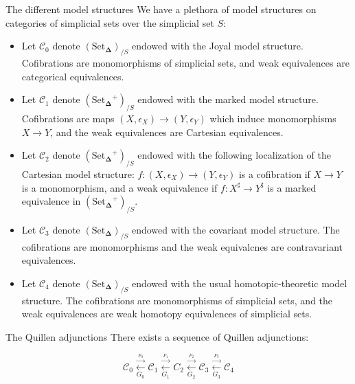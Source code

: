 \documentclass{beamer}[9pt]
\newcommand{\8}{\ensuremath{\infty}}
\newcommand{\C}{\ensuremath{\mathscr{C}}}
\newcommand{\SSet}{\ensuremath{\text{Set}_{\boldsymbol{\Delta}}}}
\newcommand{\adj}[2]{\ensuremath{\overset{\overset{#1}{ \rightarrow}}{\underset{#2}{\leftarrow}}}}
\begin{document}
\begin{frame}{The different model structures}
  We have a plethora of model structures on categories of simplicial sets over the simplicial set $S$:

  \begin{itemize}
    \item<1->[(0)] Let $\C_0$ denote $(\SSet)_{/S}$ endowed with the Joyal model structure. Cofibrations are monomorphisms of simplicial sets, and weak equivalences are categorical equivalences.
    \item<2>[(1)]  Let $\C_1$ denote $(\SSet^+)_{/S}$ endowed with the marked model structure. Cofibrations are maps $(X, \epsilon_X) \rightarrow (Y, \epsilon_Y)$ which induce monomorphisms $X \rightarrow Y$, and the weak equivalences are Cartesian equivalences.
  \end{itemize}
\end{frame}

\begin{frame}
  \begin{itemize}
    \item<1->[(2)]  Let $\C_2$ denote $(\SSet^+)_{/S}$ endowed with the following localization of the Cartesian model structure: $f : (X, \epsilon_X) \rightarrow (Y, \epsilon_Y)$ is a cofibration if $X \rightarrow Y$ is a monomorphism, and a weak equivalence if $f : X^\sharp \rightarrow Y^\sharp$ is a marked equivalence in $(\SSet^+)_{/S}$.
    \item<2->[(3)]  Let $\C_3$ denote $(\SSet)_{/S}$ endowed with the covariant model structure. The cofibrations are monomorphisms and the weak equivalcnes are contravariant equivalences.
    \item<3>[(4)] Let $\C_4$ denote $(\SSet)_{/S}$ endowed with the usual homotopic-theoretic model structure. The cofibrations are monomorphisms of simplicial sets, and the weak equivalences are weak homotopy equivalences of simplicial sets.
  \end{itemize}
\end{frame}

\begin{frame}{The Quillen adjunctions}
  There exists a sequence of Quillen adjunctions:

  $$
    \C_0 \adj{F_0}{G_0} \C_1 \adj{F_1}{G_1} C_2 \adj{F_2}{G_2} \C_3 \adj{F_3}{G_3} \C_4
  $$
\end{frame}
\end{document}
